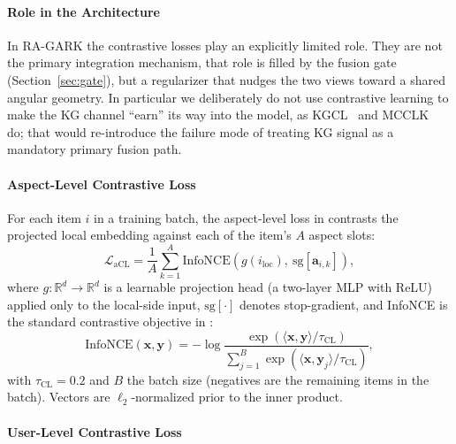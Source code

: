 \paragraph{Role in the Architecture}
\label{sec:cl-role}

In RA-GARK the contrastive losses play an explicitly limited role. They are not the primary integration mechanism, that role is filled by the fusion gate (Section~\ref{sec:gate}), but a regularizer that nudges the two views toward a shared angular geometry. In particular we deliberately do not use contrastive learning to make the KG channel ``earn'' its way into the model, as KGCL~\cite{yang2022kgcl} and MCCLK~\cite{zou2022mcclk} do; that would re-introduce the failure mode of treating KG signal as a mandatory primary fusion path.

\paragraph{Aspect-Level Contrastive Loss}
\label{sec:cl-acl}

For each item $i$ in a training batch, the aspect-level loss in  contrasts the projected local embedding against each of the item's $A$ aspect slots:
\begin{equation}
\label{eq:lacl}
\mathcal{L}_{\mathrm{aCL}} = \frac{1}{A} \sum_{k=1}^{A} \mathrm{InfoNCE}\!\left( g(i_{\mathrm{loc}}),\ \mathrm{sg}\!\left[\mathbf{a}_{i,k}\right] \right),
\end{equation}
where $g : \mathbb{R}^d \to \mathbb{R}^d$ is a learnable projection head (a two-layer MLP with ReLU) applied only to the local-side input, $\mathrm{sg}[\cdot]$ denotes stop-gradient, and InfoNCE is the standard contrastive objective in :
\begin{equation}
\label{eq:infonce}
\mathrm{InfoNCE}(\mathbf{x}, \mathbf{y}) = -\log \frac{\exp(\langle \mathbf{x}, \mathbf{y} \rangle / \tau_{\mathrm{CL}})}{\sum_{j=1}^{B} \exp(\langle \mathbf{x}, \mathbf{y}_j \rangle / \tau_{\mathrm{CL}})},
\end{equation}
with $\tau_{\mathrm{CL}} = 0.2$ and $B$ the batch size (negatives are the remaining items in the batch). Vectors are $\ell_2$-normalized prior to the inner product.

\paragraph{User-Level Contrastive Loss}
\label{sec:cl-ucl}

